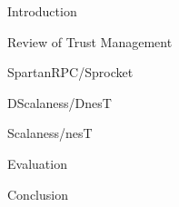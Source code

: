 

\begin{cenumerate}
\item Introduction
\item Review of Trust Management
\item SpartanRPC/Sprocket
\item DScalaness/DnesT
\item Scalaness/nesT
\item Evaluation
\item Conclusion
\end{cenumerate}
\stopslide


